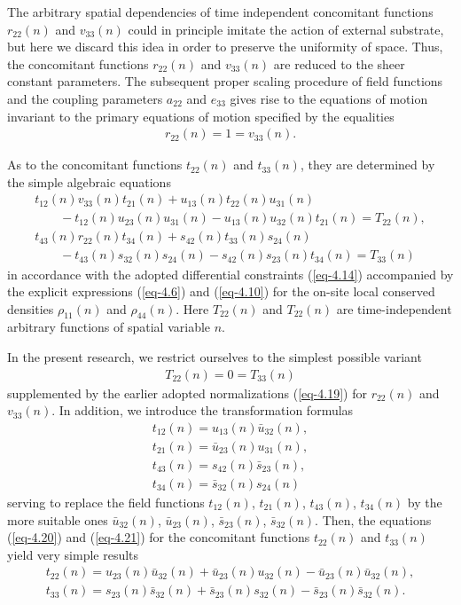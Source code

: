 \documentclass[10pt,a4paper]{amsart}
\numberwithin{equation}{section}
\begin{document}
The arbitrary spatial dependencies of time independent concomitant functions~$r_{22}(n)$ and $v_{33}(n)$ could in principle imitate the action of external substrate, but here we discard this idea in order to preserve the uniformity of space. Thus, the concomitant functions $r_{22}(n)$ and $v_{33}(n)$ are reduced to the sheer constant parameters. The subsequent proper scaling procedure of field functions and the coupling parameters $a_{22}$ and $e_{33}$ gives rise to the equations of motion invariant to the primary equations of motion specified by the equalities
\begin{gather}\label{eq-4.19}
	r_{22}(n)=1=v_{33}(n) .
\end{gather}

As to the concomitant functions $t_{22}(n)$ and $t_{33}(n)$, they are determined by the simple algebraic equations
\begin{gather}
 t_{12}(n)v_{33}(n)t_{21}(n)+u_{13}(n)t_{22}(n)u_{31}(n)\nonumber\\
 \qquad{} -t_{12}(n)u_{23}(n)u_{31}(n)-u_{13}(n)u_{32}(n)t_{21}(n) = T_{22}(n),\label{eq-4.20}
\\
	t_{43}(n)r_{22}(n)t_{34}(n)+s_{42}(n)t_{33}(n)s_{24}(n)\nonumber\\
	\qquad{} -t_{43}(n)s_{32}(n)s_{24}(n)-s_{42}(n)s_{23}(n)t_{34}(n) = T_{33}(n)\label{eq-4.21}
\end{gather}
in accordance with the adopted differential constraints (\ref{eq-4.14}) accompanied by the explicit expressions (\ref{eq-4.6}) and (\ref{eq-4.10}) for the on-site local conserved densities $\rho_{11}(n)$ and $\rho_{44}(n)$.
Here $T_{22}(n)$ and $T_{22}(n)$ are time-independent arbitrary functions of spatial variable $n$.

In the present research, we restrict ourselves to the simplest possible variant
\begin{gather}\label{eq-4.22a}
	T_{22}(n) = 0 = T_{33}(n)
\end{gather}
supplemented by the earlier adopted normalizations (\ref{eq-4.19}) for $r_{22}(n)$ and $v_{33}(n)$. In addition, we introduce the transformation formulas
\begin{gather}\label{eq-4.22}
	t_{12}(n)=u_{13}(n)\bar{u}_{32}(n),
\\ \label{eq-4.24}
	t_{21}(n)=\bar{u}_{23}(n)u_{31}(n),
\\ \label{eq-4.25}
	t_{43}(n)=s_{42}(n)\bar{s}_{23}(n),
\\ \label{eq-4.26}
	t_{34}(n)=\bar{s}_{32}(n)s_{24}(n)
\end{gather}
serving to replace the field functions $t_{12}(n)$, $t_{21}(n)$, $t_{43}(n)$, $t_{34}(n)$ by the more suitable ones $\bar{u}_{32}(n)$, $\bar{u}_{23}(n)$, $\bar{s}_{23}(n)$, $\bar{s}_{32}(n)$. Then, the equations (\ref{eq-4.20}) and (\ref{eq-4.21}) for the concomitant functions $t_{22}(n)$ and $t_{33}(n)$ yield very simple results
\begin{gather*}%
	t_{22}(n)=u_{23}(n)\bar{u}_{32}(n)+\bar{u}_{23}(n)u_{32}(n)-\bar{u}_{23}(n)\bar{u}_{32}(n),
\\ %
	t_{33}(n)=s_{23}(n)\bar{s}_{32}(n) + \bar{s}_{23}(n)s_{32}(n) - \bar{s}_{23}(n)\bar{s}_{32}(n) .
\end{gather*}
\end{document}
